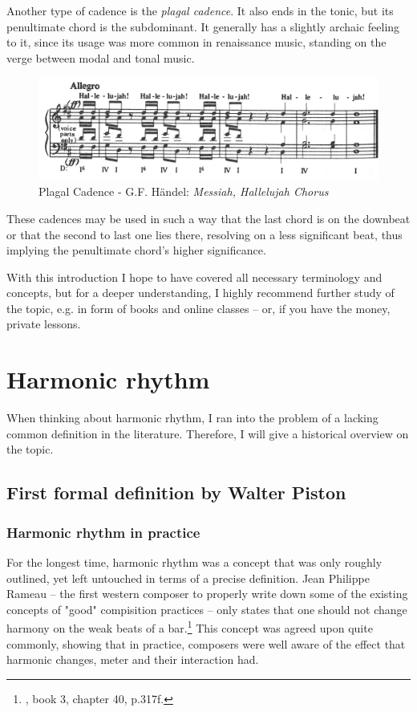 \documentclass[a4paper,12pt]{report}
\begin{document}
Another type of cadence is the \textit{plagal cadence}. It also ends in the tonic, but its penultimate chord is the subdominant. It generally has a slightly archaic feeling to it, since its usage was more common in renaissance music, standing on the verge between modal and tonal music.
\begin{figure}[h]
\centering
\includegraphics[scale=0.35]{Piston_8.jpg}
\caption{Plagal Cadence - G.F. Händel: \textit{Messiah, Hallelujah Chorus}}
\end{figure}

These cadences may be used in such a way that the last chord is on the downbeat or that the second to last one lies there, resolving on a less significant beat, thus implying the penultimate chord's higher significance.

With this introduction I hope to have covered all necessary terminology and concepts, but for a deeper understanding, I highly recommend further study of the topic, e.g. in form of books and online classes -- or, if you have the money, private lessons.

\section{Harmonic rhythm}
When thinking about harmonic rhythm, I ran into the problem of a lacking common definition in the literature. Therefore, I will give a historical overview on the topic.

\subsection{First formal definition by Walter Piston}
\subsubsection{Harmonic rhythm in practice}
For the longest time, harmonic rhythm was a concept that was only roughly outlined, yet left untouched in terms of a precise definition. Jean Philippe Rameau -- the first western composer to properly write down some of the existing concepts of "good" compisition practices -- only states that one should not change harmony on the weak beats of a bar.\footnote{\cite{rameau1722traite}, book 3, chapter 40, p.317f.} This concept was agreed upon quite commonly, showing that in practice, composers were well aware of the effect that harmonic changes, meter and their interaction had.
\end{document}
